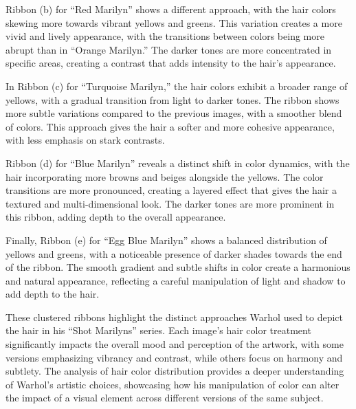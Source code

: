 \documentclass{article}
\begin{document}
Ribbon (b) for ``Red Marilyn'' shows a different approach, with the hair
colors skewing more towards vibrant yellows and greens. This variation
creates a more vivid and lively appearance, with the transitions between
colors being more abrupt than in ``Orange Marilyn.'' The darker tones
are more concentrated in specific areas, creating a contrast that adds
intensity to the hair's appearance.

In Ribbon (c) for ``Turquoise Marilyn,'' the hair colors exhibit a
broader range of yellows, with a gradual transition from light to darker
tones. The ribbon shows more subtle variations compared to the previous
images, with a smoother blend of colors. This approach gives the hair a
softer and more cohesive appearance, with less emphasis on stark
contrasts.

Ribbon (d) for ``Blue Marilyn'' reveals a distinct shift in color
dynamics, with the hair incorporating more browns and beiges alongside
the yellows. The color transitions are more pronounced, creating a
layered effect that gives the hair a textured and multi-dimensional
look. The darker tones are more prominent in this ribbon, adding depth
to the overall appearance.

Finally, Ribbon (e) for ``Egg Blue Marilyn'' shows a balanced
distribution of yellows and greens, with a noticeable presence of darker
shades towards the end of the ribbon. The smooth gradient and subtle
shifts in color create a harmonious and natural appearance, reflecting a
careful manipulation of light and shadow to add depth to the hair.

These clustered ribbons highlight the distinct approaches Warhol used to
depict the hair in his ``Shot Marilyns'' series. Each image's hair color
treatment significantly impacts the overall mood and perception of the
artwork, with some versions emphasizing vibrancy and contrast, while
others focus on harmony and subtlety. The analysis of hair color
distribution provides a deeper understanding of Warhol's artistic
choices, showcasing how his manipulation of color can alter the impact
of a visual element across different versions of the same subject.
\end{document}
